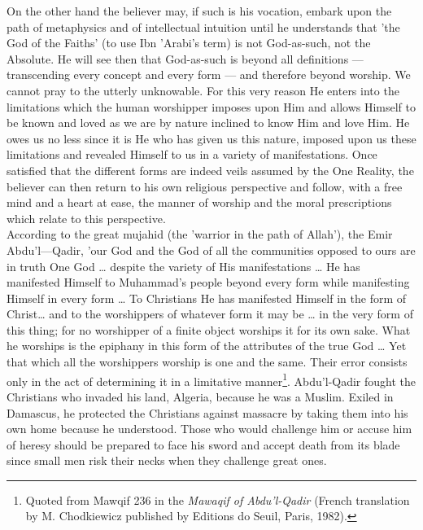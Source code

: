 \documentclass[11pt, b5paper, twoside]{book}
\begin{document}
On the other hand the believer may, if such is his vocation, embark upon the path of metaphysics and 
of intellectual intuition until he understands that 'the God of the Faiths' (to use Ibn 'Arabi's 
term) is not God-as-such, not the Absolute. He will see then that God-as-such is beyond all 
definitions --- transcending every concept and every form --- and therefore beyond worship. We cannot 
pray to the utterly unknowable. For this very reason He enters into the limitations which the human 
worshipper imposes upon Him and allows Himself to be known and loved as we are by nature inclined to 
know Him and love Him. He owes us no less since it is He who has given us this nature, imposed upon 
us these limitations and revealed Himself to us in a variety of manifestations. Once satisfied that 
the different forms are indeed veils assumed by the One Reality, the believer can then return to his 
own religious perspective and follow, with a free mind and a heart at ease, the manner of worship and 
the moral prescriptions which relate to this perspective. \\

According to the great mujahid (the 'warrior in the path of Allah'), the Emir Abdu'l---Qadir, 'our God 
and the God of all the communities opposed to ours are in truth One God \ldots{} despite the variety of 
His manifestations \ldots{} He has manifested Himself to Muhammad's people beyond every form while 
manifesting Himself in every form \ldots{} To Christians He has manifested Himself in the form of 
Christ\ldots{} and to the worshippers of whatever form it may be \ldots{} in the very form of this thing; for no worshipper of a finite object worships it for its own sake. What he worships is the epiphany in 
this form of the attributes of the true God \ldots{} Yet that which all the worshippers worship is one and 
the same. Their error consists only in the act of determining it in a limitative manner\footnote{Quoted from Mawqif 236 in the \emph{Mawaqif of Abdu'l-Qadir} (French translation by M. Chodkiewicz 
published by Editions do Seuil, Paris, 1982).}. Abdu'l-Qadir fought the Christians who invaded his land, Algeria, because he was a Muslim. Exiled in Damascus, he protected the Christians against massacre by taking them into his own home because he understood. Those who would challenge him or accuse him of heresy should be prepared to face his sword and accept death from its blade since small men risk their necks when they challenge great ones. \\
\end{document}
